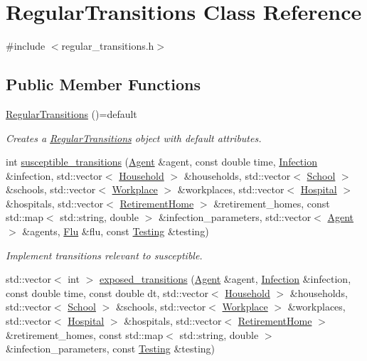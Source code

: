 \hypertarget{classRegularTransitions}{}\section{Regular\+Transitions Class Reference}
\label{classRegularTransitions}


{\ttfamily \#include $<$regular\+\_\+transitions.\+h$>$}

\subsection*{Public Member Functions}
\begin{DoxyCompactItemize}
\item 
\hyperlink{classRegularTransitions_aa9908666aa96fd2ddcbe787da091dd7c}{Regular\+Transitions} ()=default
\begin{DoxyCompactList}\small\item\em Creates a \hyperlink{classRegularTransitions}{Regular\+Transitions} object with default attributes. \end{DoxyCompactList}\item 
int \hyperlink{classRegularTransitions_a81fdcd87f0c66b867eefb351484a6852}{susceptible\+\_\+transitions} (\hyperlink{classAgent}{Agent} \&agent, const double time, \hyperlink{classInfection}{Infection} \&infection, std\+::vector$<$ \hyperlink{classHousehold}{Household} $>$ \&households, std\+::vector$<$ \hyperlink{classSchool}{School} $>$ \&schools, std\+::vector$<$ \hyperlink{classWorkplace}{Workplace} $>$ \&workplaces, std\+::vector$<$ \hyperlink{classHospital}{Hospital} $>$ \&hospitals, std\+::vector$<$ \hyperlink{classRetirementHome}{Retirement\+Home} $>$ \&retirement\+\_\+homes, const std\+::map$<$ std\+::string, double $>$ \&infection\+\_\+parameters, std\+::vector$<$ \hyperlink{classAgent}{Agent} $>$ \&agents, \hyperlink{classFlu}{Flu} \&flu, const \hyperlink{classTesting}{Testing} \&testing)
\begin{DoxyCompactList}\small\item\em Implement transitions relevant to susceptible. \end{DoxyCompactList}\item 
std\+::vector$<$ int $>$ \hyperlink{classRegularTransitions_a7ca3a68bfecd66d831b9daf9e467b930}{exposed\+\_\+transitions} (\hyperlink{classAgent}{Agent} \&agent, \hyperlink{classInfection}{Infection} \&infection, const double time, const double dt, std\+::vector$<$ \hyperlink{classHousehold}{Household} $>$ \&households, std\+::vector$<$ \hyperlink{classSchool}{School} $>$ \&schools, std\+::vector$<$ \hyperlink{classWorkplace}{Workplace} $>$ \&workplaces, std\+::vector$<$ \hyperlink{classHospital}{Hospital} $>$ \&hospitals, std\+::vector$<$ \hyperlink{classRetirementHome}{Retirement\+Home} $>$ \&retirement\+\_\+homes, const std\+::map$<$ std\+::string, double $>$ \&infection\+\_\+parameters, const \hyperlink{classTesting}{Testing} \&testing)

\end{DoxyCompactItemize}
